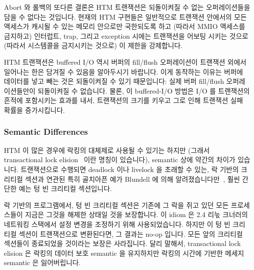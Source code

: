 Abort 와 롤백의 또다른 결론은 HTM 트랜잭션은 되돌이켜질 수 없는 오퍼레이션들을
담을 수 없다는 것입니다.
현재의 HTM 구현들은 일반적으로 트랜잭션 안에서의 모든 액세스가 캐시될 수 있는
메모리 안으로만 국한되도록 하고 (따라서 MMIO 액세스를 금지하고) 인터럽트, trap,
그리고 exception 시에는 트랜잭션을 어보팅 시키는 것으로 (따라서 시스템콜을
금지시키는 것으로) 이 제한을 강제합니다.

HTM 트랜잭션은 buffered I/O 역시 버퍼의 fill/flush 오퍼레이션이 트랜잭션 외에서
일어나는 한은 담겨질 수 있음을 알아두시기 바랍니다.
이게 동작하는 이유는 버퍼에 데이터를 넣고 빼는 것은 되돌이켜질 수 있기
때문입니다: 실제 버퍼 fill/flush 오퍼레이션들만이 되돌이켜질 수 없습니다.
물론, 이 buffered-I/O 방법은 I/O 를 트랜잭션의 흔적에 포함시키는 효과를 내서,
트랜잭션의 크기를 키우고 그로 인해 트랜잭션 실패 확률을 증가시킵니다.
\iffalse

Another consequence of aborts and rollbacks is that HTM transactions
cannot accommodate irrevocable operations.
Current HTM implementations typically enforce this limitation by
requiring that all of the accesses in the transaction be to cacheable
memory (thus prohibiting MMIO accesses) and aborting transactions on
interrupts, traps, and exceptions (thus prohibiting system calls).

Note that buffered I/O can be accommodated by HTM transactions as
long as the buffer fill/flush operations occur extra-transactionally.
The reason that this works is that adding data to and removing data
from the buffer is revocable: Only the actual buffer fill/flush
operations are irrevocable.
Of course, this buffered-I/O approach has the effect of including the I/O
in the transaction's footprint, increasing the size of the transaction
and thus increasing the probability of failure.
\fi

\subsubsection{Semantic Differences}
\label{sec:future:Semantic Differences}

HTM 이 많은 경우에 락킹의 대체제로 사용될 수 있기는 하지만 (그래서
transactional lock elision~\cite{DaveDice2008TransactLockElision} 이란 명칭이
있습니다), semantic 상에 약간의 차이가 있습니다.
트랜잭션으로 수행되면 deadlock 이나 livelock 을 초래할 수 있는, 락 기반의
크리티컬 섹션과 연관된 특히 골치아픈 예가 Blundell 에 의해
알려졌습니다만~\cite{Blundell2006TMdeadlock}, 훨씬 간단한 예는 텅 빈 크리티컬
섹션입니다.

락 기반의 프로그램에서, 텅 빈 크리티컬 섹션은 기존에 그 락을 쥐고 있던 모든
프로세스들이 지금은 그것을 해제한 상태일 것을 보장합니다.
이 idiom 은 2.4 리눇 크너러의 네트워킹 스택에서 설정 변경을 조정하기 위해
사용되었습니다.
하지만 이 텅 빈 크리티컬 섹션이 트랜잭션으로 변환된다면, 그 결과는 no-op
입니다.
모든 앞의 크리티컬 섹션들이 종료되었을 것이라는 보장은 사라집니다.
달리 말해서, transactional lock elision 은 락킹의 데이터 보호 semantic 을
유지하지만 락킹의 시간에 기반한 메세지 semantic 은 잃어버립니다.
\iffalse

